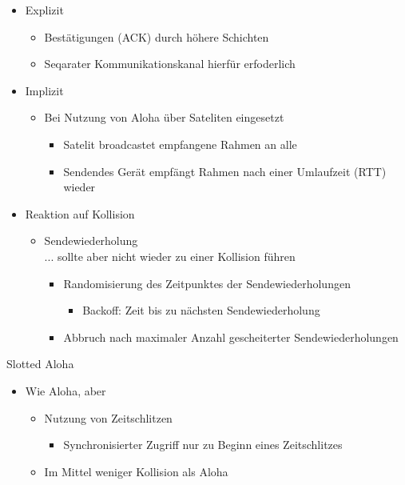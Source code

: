       \begin{itemize}
        \item Explizit
          \begin{itemize}
            \item Bestätigungen (ACK) durch höhere Schichten
            \item Seqarater Kommunikationskanal hierfür erfoderlich
          \end{itemize}
        \item Implizit
          \begin{itemize}
            \item Bei Nutzung von Aloha über Sateliten eingesetzt
              \begin{itemize}
                \item Satelit broadcastet empfangene Rahmen an alle
                \item Sendendes Gerät empfängt Rahmen nach einer Umlaufzeit (RTT) wieder
              \end{itemize}
          \end{itemize}
        \item Reaktion auf Kollision
          \begin{itemize}
            \item Sendewiederholung\\
              ... sollte aber nicht wieder zu einer Kollision führen
              \begin{itemize}
                \item Randomisierung des Zeitpunktes der Sendewiederholungen
                  \begin{itemize}
                    \item Backoff: Zeit bis zu nächsten Sendewiederholung
                  \end{itemize}
                \item Abbruch nach maximaler Anzahl gescheiterter Sendewiederholungen
              \end{itemize}
          \end{itemize}
      \end{itemize}
      Slotted Aloha
      \begin{itemize}
        \item Wie Aloha, aber
          \begin{itemize}
            \item Nutzung von Zeitschlitzen
              \begin{itemize}
                \item Synchronisierter Zugriff nur zu Beginn eines Zeitschlitzes
              \end{itemize}
            \item Im Mittel weniger Kollision als Aloha
          \end{itemize}
      \end{itemize}
